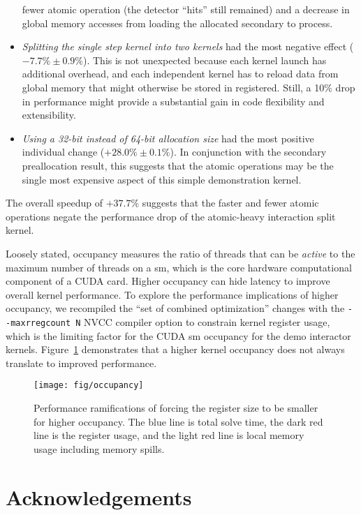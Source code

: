 \documentclass{webofc}
\begin{document}
\begin{itemize}
    fewer atomic operation (the detector ``hits'' still remained) and a decrease
    in global
    memory accesses from loading the allocated secondary to process.
  \item \emph{Splitting the single step kernel into two kernels} had the most
    negative effect ($-7.7\% \pm 0.9\%$). This is not unexpected because each
    kernel launch has additional overhead, and each independent kernel has to
    reload data from global memory that might otherwise be stored in registered.
    Still, a 10\% drop in performance might provide a substantial gain in code
    flexibility and extensibility.
  \item \emph{Using a 32-bit instead of 64-bit allocation size} had the most
    positive individual change ($+28.0\% \pm 0.1\%$). In conjunction with the
    secondary preallocation result, this suggests that the atomic operations may
    be the single most expensive aspect of this simple demonstration kernel.
\end{itemize}

The overall speedup of $+37.7\%$ suggests that the faster and fewer atomic
operations negate the performance drop of the atomic-heavy interaction split
kernel.

Loosely stated, occupancy measures the ratio of threads that can be
\emph{active} to the maximum number of threads on a \ac{sm},
which is the core hardware computational component of a CUDA card. Higher
occupancy can hide latency to improve overall kernel performance.
To explore the performance implications of higher occupancy, we recompiled the
``set of combined optimization'' changes with the \verb|--maxrregcount N| NVCC
compiler option to constrain kernel register usage,
which is the limiting factor for the CUDA \ac{sm} occupancy for the demo
interactor kernels. Figure~\ref{fig:occupancy} demonstrates that a higher
kernel occupancy does not always translate to improved performance.

\begin{figure}[htb]
  \centering
  \texttt{[image: fig/occupancy]}
  \caption{Performance ramifications of forcing the register size to be smaller
  for higher occupancy. The blue line is total solve time, the dark red line is
the register usage, and the light red line is local memory usage including
memory spills.}
  \label{fig:occupancy}
\end{figure}

\section{Acknowledgements}
\end{document}

